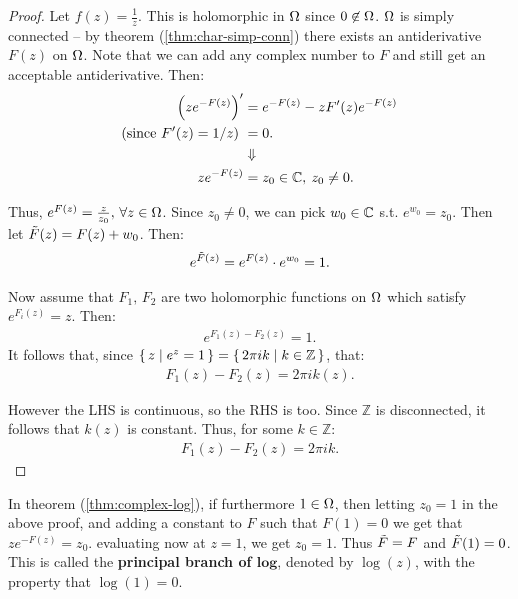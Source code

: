 \begin{proof} Let $f(z) = \frac{1}{z}$. This is holomorphic in $\Omega$ since $0 \not\in \Omega$. $\Omega$ is simply connected -- by theorem (\ref{thm:char-simp-conn}) there exists an antiderivative $F(z)$ on $\Omega$. Note that we can add any complex number to $F$ and still get an acceptable antiderivative. Then:
\begin{align*}
    \left( ze^{-F(z)} \right)' &= e^{-F(z)} - z F'(z) e^{-F(z)}\\
    \text{(since $F'(z) = 1/z$) }&= 0.\\
    &\Downarrow\\
    ze^{-F(z)} &= z_0 \in \mathbb{C}, \: z_0 \neq 0.
\end{align*}

Thus, $e^{F(z)} = \frac{z}{z_0}, \, \forall z \in \Omega$. Since $z_0 \neq 0$, we can pick $w_0 \in \mathbb{C}$ s.t. $e^{w_0} = z_0$. Then let $\Tilde{F} (z) = F(z) + w_0$. Then:
\begin{align*}
    e^{\Tilde{F} (z)} = e^{F (z)} \cdot e^{w_0} = 1.
\end{align*}


Now assume that $F_1, \, F_2$ are two holomorphic functions on $\Omega$ which satisfy $e^{F_i(z)} = z$. Then:
\begin{align*}
e^{F_1(z) - F_2(z)} = 1.
\end{align*}
It follows that, since $\set{z \mid e^z = 1} = \set{ 2 \pi i k \mid k \in \mathbb{Z}}$, that:
\begin{align*}
    F_1(z) - F_2(z) = 2 \pi i k(z).
\end{align*}

However the LHS is continuous, so the RHS is too. Since $\mathbb{Z}$ is disconnected, it follows that $k(z)$ is constant. Thus, for some $k \in \mathbb{Z}$:
\begin{align*}
    F_1(z) - F_2(z) = 2 \pi i k.
\end{align*}

\end{proof}


\begin{remark}
In theorem (\ref{thm:complex-log}), if furthermore $1 \in \Omega$, then letting $z_0 = 1$ in the above proof, and adding a constant to $F$ such that $F(1) = 0$ we get that $ze^{-F(z)} = z_0$. evaluating now at $z=1$, we get $z_0 = 1$. Thus $\Tilde{F} = F$ and $\Tilde{F} (1) = 0$.\\

This is called the \textbf{principal branch of $\mathbf{log}$}, denoted by $\log(z)$, with the property that $\log(1) = 0$.
\end{remark}

